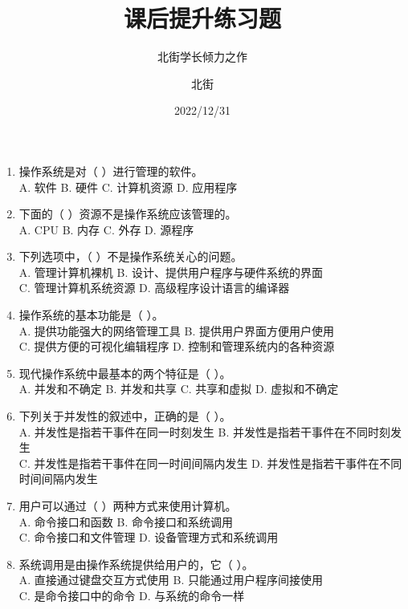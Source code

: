 \documentclass[lang=cn,newtx,10pt,scheme=chinese]{../../elegantbook}
\title{课后提升练习题}
\subtitle{北街学长倾力之作}
\author{北街}
\date{2022/12/31}
\begin{document}
\maketitle
\frontmatter

\tableofcontents

\mainmatter

\begin{enumerate}
  \item 操作系统是对（ ）进行管理的软件。\\
  A. 软件 \quad B. 硬件 \quad C. 计算机资源 \quad D. 应用程序

  \item 下面的（ ）资源不是操作系统应该管理的。\\
  A. CPU \quad B. 内存 \quad C. 外存 \quad D. 源程序

  \item 下列选项中，（ ）不是操作系统关心的问题。\\
  A. 管理计算机裸机 \quad B. 设计、提供用户程序与硬件系统的界面\\
  C. 管理计算机系统资源 \quad D. 高级程序设计语言的编译器

  \item 操作系统的基本功能是（ ）。\\
  A. 提供功能强大的网络管理工具 \quad B. 提供用户界面方便用户使用\\
  C. 提供方便的可视化编辑程序 \quad D. 控制和管理系统内的各种资源

  \item 现代操作系统中最基本的两个特征是（ ）。\\
  A. 并发和不确定 \quad B. 并发和共享 \quad C. 共享和虚拟 \quad D. 虚拟和不确定

  \item 下列关于并发性的叙述中，正确的是（ ）。\\
  A. 并发性是指若干事件在同一时刻发生 \quad B. 并发性是指若干事件在不同时刻发生\\
  C. 并发性是指若干事件在同一时间间隔内发生 \quad D. 并发性是指若干事件在不同时间间隔内发生

  \item 用户可以通过（ ）两种方式来使用计算机。\\
  A. 命令接口和函数 \quad B. 命令接口和系统调用\\
  C. 命令接口和文件管理 \quad D. 设备管理方式和系统调用

  \item 系统调用是由操作系统提供给用户的，它（ ）。\\
  A. 直接通过键盘交互方式使用 \quad B. 只能通过用户程序间接使用\\
  C. 是命令接口中的命令 \quad D. 与系统的命令一样


\end{enumerate}
\end{document}
